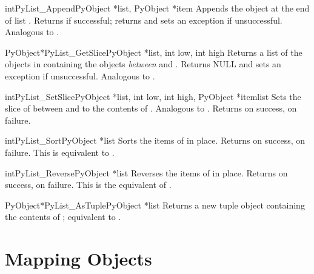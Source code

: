 \documentclass{manual}
\begin{document}
\begin{cfuncdesc}{int}{PyList_Append}{PyObject *list, PyObject *item}
Appends the object  at the end of list .  Returns
 if successful; returns  and sets an exception if
unsuccessful.  Analogous to .
\end{cfuncdesc}

\begin{cfuncdesc}{PyObject*}{PyList_GetSlice}{PyObject *list,
                                              int low, int high}
Returns a list of the objects in  containing the objects 
\emph{between}  and .  Returns NULL and sets an
exception if unsuccessful.
Analogous to .
\end{cfuncdesc}

\begin{cfuncdesc}{int}{PyList_SetSlice}{PyObject *list,
                                        int low, int high,
                                        PyObject *itemlist}
Sets the slice of  between  and  to the
contents of .  Analogous to
.  Returns
 on success,  on failure.
\end{cfuncdesc}

\begin{cfuncdesc}{int}{PyList_Sort}{PyObject *list}
Sorts the items of  in place.  Returns  on success,
 on failure.  This is equivalent to
.
\end{cfuncdesc}

\begin{cfuncdesc}{int}{PyList_Reverse}{PyObject *list}
Reverses the items of  in place.  Returns  on
success,  on failure.  This is the equivalent of
.
\end{cfuncdesc}

\begin{cfuncdesc}{PyObject*}{PyList_AsTuple}{PyObject *list}
Returns a new tuple object containing the contents of ;
equivalent to .
\end{cfuncdesc}


\section{Mapping Objects \label{mapObjects}}
\end{document}
